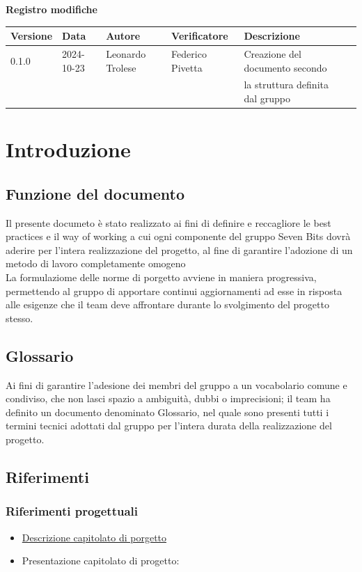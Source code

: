 \documentclass[10pt]{article}
\begin{document}
\centering\textbf{Registro modifiche}\\
\vspace{2mm}
\begin{tabular}{|l|l|l|l|l|l|}
\hline
\textbf{Versione} & \textbf{Data} & \textbf{Autore} & \textbf{Verificatore} & \textbf{Descrizione}\\
\hline
0.1.0 & 2024-10-23  & Leonardo Trolese & Federico Pivetta  & Creazione del documento secondo \\ & & & & la struttura definita dal gruppo\\
\hline

\end{tabular}
\newpage
\raggedright
\tableofcontents
\newpage

\section{Introduzione}
    \subsection{Funzione del documento}
    Il presente documeto è stato realizzato ai fini di definire e reccagliore le best 
    practices e il way of working a cui ogni componente del gruppo Seven Bits dovrà
    aderire per l'intera realizzazione del progetto, al fine di garantire l'adozione 
    di un metodo di lavoro completamente omogeno\\
    La formulaziome delle norme di porgetto avviene in maniera progressiva, permettendo
    al gruppo di apportare continui aggiornamenti ad esse in risposta alle esigenze che
    il team deve affrontare durante lo svolgimento del progetto stesso.\\ 

    \subsection{Glossario}
    Ai fini di garantire l'adesione dei membri del gruppo a un vocabolario comune 
    e condiviso, che non lasci spazio a ambiguità, dubbi o imprecisioni; il team ha definito
    un documento denominato Glossario, nel quale sono presenti tutti i termini tecnici adottati
    dal gruppo per l'intera durata della realizzazione del progetto.

    \subsection{Riferimenti}
        \subsubsection{Riferimenti progettuali}
        \begin{itemize}
            \item \href{https://www.math.unipd.it/~tullio/IS-1/2024/Progetto/C4.pdf}{Descrizione capitolato di porgetto}
            \item Presentazione capitolato di progetto: 
        \end{itemize}
\end{document}
